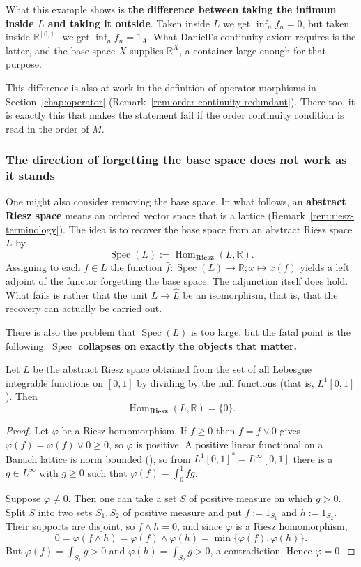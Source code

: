 \noindent
What this example shows is \textbf{the difference between taking the infimum
inside $L$ and taking it outside}.
Taken inside $L$ we get $\inf_nf_n=0$, but taken inside
$\mathbb{R}^{[0,1]}$ we get $\inf_nf_n=1_A$.
What Daniell's continuity axiom requires is the latter, and the base space $X$
supplies $\mathbb{R}^X$, a container large enough for that purpose.

This difference is also at work in the definition of operator morphisms in
Section~\ref{chap:operator}
(Remark~\ref{rem:order-continuity-redundant}).
There too, it is exactly this that makes the statement fail if the order
continuity condition is read in the order of $M$.

\subsubsection{The direction of forgetting the base space does not work as it stands}

One might also consider removing the base space.
In what follows, an \textbf{abstract Riesz space} means an ordered vector space
that is a lattice (Remark~\ref{rem:riesz-terminology}).
The idea is to recover the base space from an abstract Riesz space $L$ by
\[
  \operatorname{Spec}(L):=\operatorname{Hom}_{\mathbf{Riesz}}(L,\mathbb{R}) .
\]
Assigning to each $f\in L$ the function
$\widehat{f}:\operatorname{Spec}(L)\to\mathbb{R};x\mapsto x(f)$ yields a left
adjoint of the functor forgetting the base space.
The adjunction itself does hold. What fails is rather that the unit
$L\to\widehat{L}$ be an isomorphism, that is, that the recovery can actually be
carried out.

There is also the problem that $\operatorname{Spec}(L)$ is too large, but the
fatal point is the following: \textbf{$\operatorname{Spec}$ collapses on exactly
the objects that matter.}

\begin{proposition}\label{prop:spec-collapses}
  Let $L$ be the abstract Riesz space obtained from the set of all Lebesgue
  integrable functions on $[0,1]$ by dividing by the null functions (that is,
  $L^1[0,1]$). Then
  \[
    \operatorname{Hom}_{\mathbf{Riesz}}(L,\mathbb{R})=\{0\} .
  \]
\end{proposition}
\begin{proof}
  Let $\varphi$ be a Riesz homomorphism.
  If $f\ge0$ then $f=f\vee0$ gives
  $\varphi(f)=\varphi(f)\vee0\ge0$, so $\varphi$ is positive.
  A positive linear functional on a Banach lattice is norm bounded
  (\cite{AbramovichAliprantis}), so from
  $L^1[0,1]^*=L^\infty[0,1]$ there is a $g\in L^\infty$ with $g\ge0$ such that
  $\varphi(f)=\int_0^1fg$.

  Suppose $\varphi\ne0$. Then one can take a set $S$ of positive measure on
  which $g>0$.
  Split $S$ into two sets $S_1,S_2$ of positive measure and put
  $f:=1_{S_1}$ and $h:=1_{S_2}$.
  Their supports are disjoint, so $f\wedge h=0$, and since $\varphi$ is a Riesz
  homomorphism,
  \[
    0=\varphi(f\wedge h)=\varphi(f)\wedge\varphi(h)=\min\{\varphi(f),\varphi(h)\} .
  \]
  But $\varphi(f)=\int_{S_1}g>0$ and $\varphi(h)=\int_{S_2}g>0$, a
  contradiction.
  Hence $\varphi=0$.
\end{proof}


